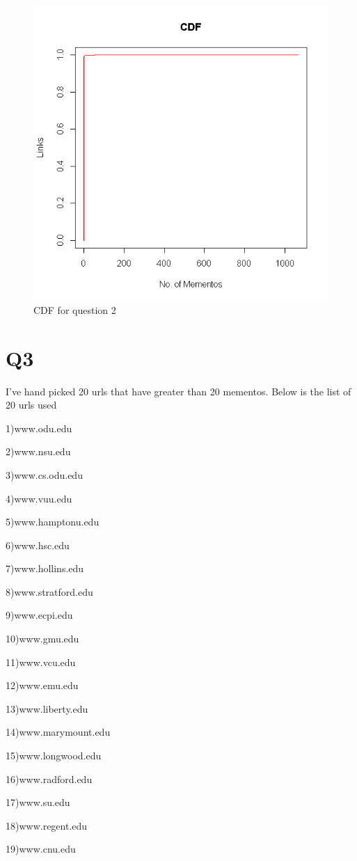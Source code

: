 \documentclass[12pt]{article} %
\begin{document}
\begin{figure}
\includegraphics[width=.8\textwidth]{cdf-q2.png}
\caption{CDF for question 2}
\end{figure}

\section{Q3}
I've hand picked 20 urls that have greater than 20 mementos. Below is the list of 20 urls used 

1)www.odu.edu

2)www.nsu.edu

3)www.cs.odu.edu

4)www.vuu.edu

5)www.hamptonu.edu

6)www.hsc.edu

7)www.hollins.edu

8)www.stratford.edu

9)www.ecpi.edu

10)www.gmu.edu

11)www.vcu.edu

12)www.emu.edu

13)www.liberty.edu

14)www.marymount.edu

15)www.longwood.edu

16)www.radford.edu

17)www.su.edu

18)www.regent.edu

19)www.cnu.edu
\end{document}
